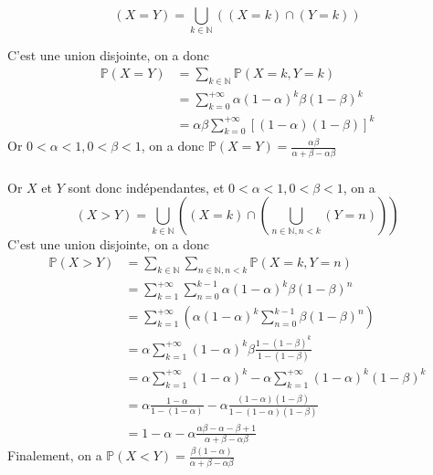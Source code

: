 \documentclass[a4paper,12pt]{book}
\begin{document}
$$(X=Y)=\bigcup_{k\in \mathbb{N}}\left((X=k)\cap(Y=k)\right)$$

C'est une union disjointe, on a donc 
\begin{align*}
    \mathbb{P}(X=Y)&=\sum_{k \in \mathbb{N}}\mathbb{P}(X=k,Y=k)\\
                   &=\sum_{k =0}^{+\infty}\alpha  (1-\alpha)^k\beta(1-\beta)^k\\
                   &=\alpha \beta \sum_{k =0}^{+\infty}[(1-\alpha)(1-\beta)]^k
\end{align*}
Or $0<\alpha <1, 0<\beta <1$, on a donc $\boxed{\mathbb{P}(X=Y)=\frac{\alpha \beta}{\alpha+\beta-\alpha \beta}}$
\subsubsection{}
Or $X$ et $Y$ sont donc indépendantes, et $0<\alpha <1, 0<\beta <1$, on a
$$
(X>Y)=\bigcup_{k\in \mathbb{N}}\left((X=k)\cap\left(\bigcup_{n \in \mathbb{N}, n<k}(Y=n)\right)\right)
$$
C'est une union disjointe, on a donc 
\begin{align*}
    \mathbb{P}(X>Y)&=\sum_{k \in \mathbb{N}}\sum_{n \in \mathbb{N},n<k}\mathbb{P}(X=k,Y=n)\\
                   &=\sum_{k =1}^{+\infty}\sum_{n =0}^{k-1}\alpha  (1-\alpha)^k\beta(1-\beta)^n\\
                   &=\sum_{k =1}^{+\infty}\left(\alpha  (1-\alpha)^k\sum_{n =0}^{k-1}\beta(1-\beta)^n\right)\\
                   &=\alpha \sum_{k =1}^{+\infty}(1-\alpha)^k\beta \frac{1-(1-\beta)^{k}}{1-(1-\beta)}\\
                   &=\alpha \sum_{k =1}^{+\infty}(1-\alpha)^k-\alpha \sum_{k =1}^{+\infty}(1-\alpha)^k(1-\beta)^k\\
                   &=\alpha \frac{1-\alpha}{1-(1-\alpha)}-\alpha \frac{(1-\alpha)(1-\beta)}{1-(1-\alpha)(1-\beta)}\\
                   &=1-\alpha-\alpha\frac{\alpha\beta-\alpha-\beta+1}{\alpha+\beta-\alpha\beta}
\end{align*}
Finalement, on a $\boxed{\mathbb{P}(X<Y)=\frac{\beta(1-\alpha)}{\alpha+\beta-\alpha\beta}}$
\end{document}
